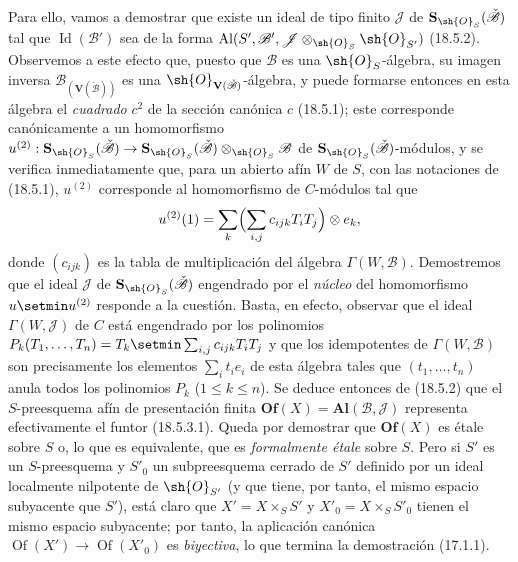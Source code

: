Para ello, vamos a demostrar que existe un ideal de tipo finito $\mathscr J$ de $\mathbf S_{\sh{O}_S}(\check{\mathscr B})$ tal que $\operatorname{Id}(\mathscr B')$ sea de la forma $\operatorname{Al}(S',\mathscr B',\mathscr J\otimes_{\sh{O}_S}\sh{O}_{S'})$ (18.5.2). Observemos a este efecto que, puesto que $\mathscr B$ es una $\sh{O}_S$-álgebra, su imagen inversa $\mathscr B_{(\mathbf V(\check{\mathscr B}))}$ es una $\sh{O}_{\mathbf V(\check{\mathscr B})}$-álgebra, y puede formarse entonces en esta álgebra el \emph{cuadrado} $c^2$ de la sección canónica $c$ (18.5.1); este corresponde canónicamente a un homomorfismo $u^{(2)}:\mathbf S_{\sh{O}_S}(\check{\mathscr B})\to\mathbf S_{\sh{O}_S}(\check{\mathscr B})\otimes_{\sh{O}_S}\mathscr B$ de $\mathbf S_{\sh{O}_S}(\check{\mathscr B})$-módulos, y se verifica inmediatamente que, para un abierto afín $W$ de $S$, con las notaciones de (18.5.1), $u^{(2)}$ corresponde al homomorfismo de $C$-módulos tal que
\[
  u^{(2)}(1)=\sum_k\Bigl(\sum_{i,j}c_{ijk}T_iT_j\Bigr)\otimes e_k,
\]
donde $(c_{ijk})$ es la tabla de multiplicación del álgebra $\Gamma(W,\mathscr B)$. Demostremos que el ideal $\mathscr J$ de $\mathbf S_{\sh{O}_S}(\check{\mathscr B})$ engendrado por el \emph{núcleo} del homomorfismo $u\setmin u^{(2)}$ responde a la cuestión. Basta, en efecto, observar que el ideal $\Gamma(W,\mathscr J)$ de $C$ está engendrado por los polinomios $P_k(T_1,\ldots,T_n)=T_k\setmin\sum_{i,j}c_{ijk}T_iT_j$ y que los idempotentes de $\Gamma(W,\mathscr B)$ son precisamente los elementos $\sum_i t_i e_i$ de esta álgebra tales que $(t_1,\ldots,t_n)$ anula todos los polinomios $P_k$ ($1\leq k\leq n$). Se deduce entonces de (18.5.2) que el $S$-preesquema afín de presentación finita $\mathbf{Of}(X)=\mathbf{Al}(\mathscr B,\mathscr J)$ representa efectivamente el funtor (18.5.3.1). Queda por demostrar que $\mathbf{Of}(X)$ es étale sobre $S$ o, lo que es equivalente, que es \emph{formalmente étale} sobre $S$. Pero si $S'$ es un $S$-preesquema y $S'_0$ un subpreesquema cerrado de $S'$ definido por un ideal localmente nilpotente de $\sh{O}_{S'}$ (y que tiene, por tanto, el mismo espacio subyacente que $S'$), está claro que $X'=X\times_S S'$ y $X'_0=X\times_S S'_0$ tienen el mismo espacio subyacente; por tanto, la aplicación canónica $\operatorname{Of}(X')\to\operatorname{Of}(X'_0)$ es \emph{biyectiva}, lo que termina la demostración (17.1.1).

